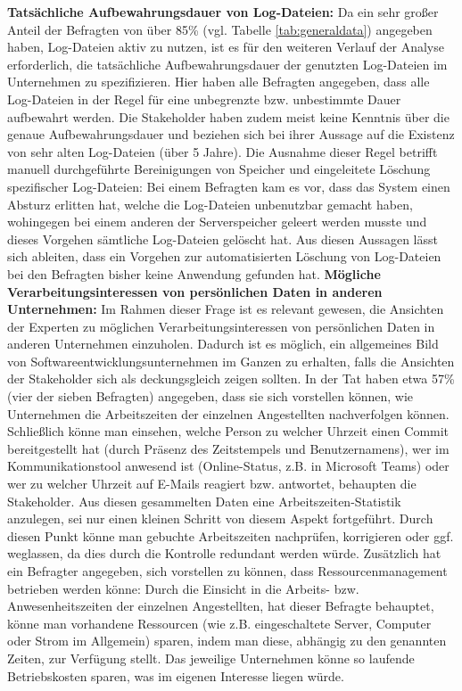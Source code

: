 \textbf{Tatsächliche Aufbewahrungsdauer von Log-Dateien:} \newline \label{logs}
Da ein sehr großer Anteil der Befragten von über 85\% (vgl. Tabelle \ref{tab:generaldata}) angegeben haben, Log-Dateien aktiv zu nutzen, ist es für den weiteren Verlauf der Analyse erforderlich, die tatsächliche Aufbewahrungsdauer der genutzten Log-Dateien 
im Unternehmen zu spezifizieren. Hier haben alle Befragten angegeben, dass alle Log-Dateien in der Regel für eine unbegrenzte bzw. unbestimmte Dauer aufbewahrt werden. Die Stakeholder haben zudem meist keine Kenntnis über die genaue Aufbewahrungsdauer und 
beziehen sich bei ihrer Aussage auf die Existenz von sehr alten Log-Dateien (über 5 Jahre). Die Ausnahme dieser Regel betrifft manuell durchgeführte Bereinigungen von Speicher und eingeleitete Löschung spezifischer Log-Dateien: Bei einem Befragten kam es vor,
dass das System einen Absturz erlitten hat, welche die Log-Dateien unbenutzbar gemacht haben, wohingegen bei einem anderen der Serverspeicher geleert werden musste und dieses Vorgehen sämtliche Log-Dateien gelöscht hat. \newline Aus diesen Aussagen lässt sich 
ableiten, dass ein Vorgehen zur automatisierten Löschung von Log-Dateien bei den Befragten bisher keine Anwendung gefunden hat. \newline \newline
\textbf{Mögliche Verarbeitungsinteressen von persönlichen Daten in anderen Unternehmen:} \newline
Im Rahmen dieser Frage ist es relevant gewesen, die Ansichten der Experten zu möglichen Verarbeitungsinteressen von persönlichen Daten in anderen Unternehmen einzuholen. Dadurch ist es möglich, ein allgemeines Bild von Softwareentwicklungsunternehmen im Ganzen zu erhalten, falls die Ansichten der Stakeholder sich als deckungsgleich zeigen sollten. In der Tat haben etwa 57\% (vier der sieben Befragten) angegeben,
dass sie sich vorstellen können, wie Unternehmen die Arbeitszeiten der einzelnen Angestellten nachverfolgen können. Schließlich könne man einsehen, welche Person zu welcher Uhrzeit einen Commit bereitgestellt hat (durch Präsenz des Zeitstempels und Benutzernamens), wer im Kommunikationstool anwesend ist (Online-Status, z.B. in Microsoft Teams) oder wer zu welcher Uhrzeit auf E-Mails reagiert bzw. antwortet, behaupten die Stakeholder.
Aus diesen gesammelten Daten eine Arbeitszeiten-Statistik anzulegen, sei nur einen kleinen Schritt von diesem Aspekt fortgeführt. Durch diesen Punkt könne man gebuchte Arbeitszeiten nachprüfen, korrigieren oder ggf. weglassen, da dies durch die Kontrolle redundant werden würde. \newline
Zusätzlich hat ein Befragter angegeben, sich vorstellen zu können, dass Ressourcenmanagement betrieben werden könne: Durch die Einsicht in die Arbeits- bzw. Anwesenheitszeiten der einzelnen Angestellten, hat dieser Befragte behauptet, könne man vorhandene Ressourcen (wie z.B. eingeschaltete Server, Computer oder Strom im Allgemein) sparen, indem man diese, abhängig zu den genannten Zeiten, zur Verfügung stellt. Das jeweilige Unternehmen
könne so laufende Betriebskosten sparen, was im eigenen Interesse liegen würde.

